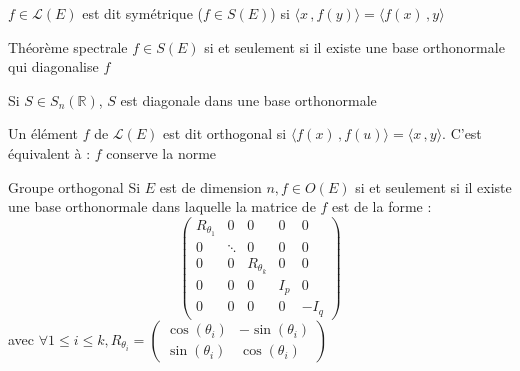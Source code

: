 \documentclass[french, a4paper, 11pt, twocolumn]{article}
\newcommand{\scal}[2]{\langle #1\, ,#2 \rangle}
\newcommand{\R}{\mathbb{R}}   %
\begin{document}
\begin{definition}
  \(f \in \mathcal{L}(E)\) est dit symétrique (\(f\in S(E)\)) si \(\scal{x}{f(y)}=\scal{f(x)}{y}\)
\end{definition}

\begin{theorem}{Théorème spectrale}
  \(f \in S(E)\) si et seulement si il existe une base orthonormale qui diagonalise \(f\)
  
  \tcblower

  Si \(S \in S_n(\R)\), \(S\) est diagonale dans une base orthonormale
\end{theorem}

\begin{definition}
  Un élément \(f\) de \(\mathcal{L}(E)\) est dit orthogonal si \(\scal{f(x)}{f(u)}=\scal{x}{y}\).
  C'est équivalent à : \(f\) conserve la norme
\end{definition}

\begin{theorem}{Groupe orthogonal}
  Si \(E\) est de dimension \(n, f \in O(E)\) si et seulement si
  il existe une base orthonormale dans laquelle la matrice de \(f\) est de la forme :
  \[\begin{pmatrix}
    R_{\theta_1} & 0 & 0 & 0 & 0 \\
    0 & \ddots & 0 & 0 & 0 \\
    0 & 0 & R_{\theta_k} & 0 & 0 \\
    0 & 0 & 0 & I_p & 0 \\
    0 & 0 & 0 & 0 & -I_q
  \end{pmatrix}\]
  avec \(\forall 1\leq i\leq k,
  R_{\theta_i}=\begin{pmatrix}
    \cos(\theta_i) & -\sin(\theta_i) \\
    \sin(\theta_i) & \cos(\theta_i)
  \end{pmatrix}\)
\end{theorem}
\end{document}
